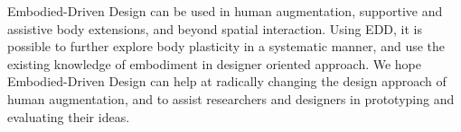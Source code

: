 {Embodied-Driven Design can be used in human augmentation, supportive and assistive body extensions, and beyond spatial interaction. Using EDD, it is possible to further explore body plasticity in a systematic manner, and use the existing knowledge of embodiment in designer oriented approach. We hope Embodied-Driven Design can help at radically changing the design approach of human augmentation, and to assist researchers and designers in prototyping and evaluating their ideas.



}